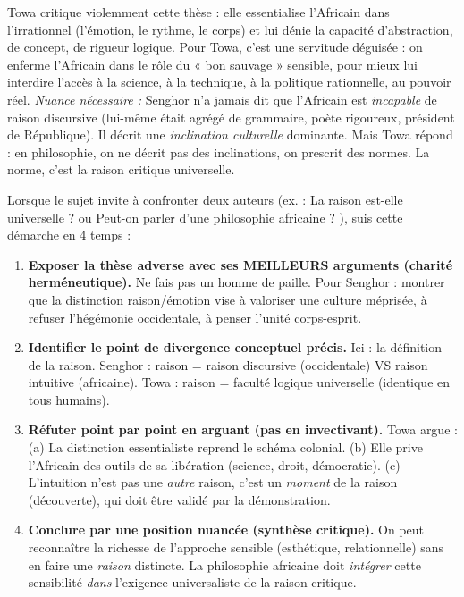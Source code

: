 \documentclass[11pt]{article}
\newcommand{\cle}[1]{{\popxbold\color{popdark}#1}}
\begin{document}
\begin{attention}
Towa critique violemment cette thèse : elle essentialise l'Africain dans l'irrationnel (l'émotion, le rythme, le corps) et lui dénie la capacité d'abstraction, de concept, de rigueur logique. Pour Towa, c'est une \guillemotleft servitude déguisée \guillemotright : on enferme l'Africain dans le rôle du « bon sauvage » sensible, pour mieux lui interdire l'accès à la science, à la technique, à la politique rationnelle, au pouvoir réel.
\emph{Nuance nécessaire :} Senghor n'a jamais dit que l'Africain est \emph{incapable} de raison discursive (lui-même était agrégé de grammaire, poète rigoureux, président de République). Il décrit une \emph{inclination culturelle} dominante. Mais Towa répond : en philosophie, on ne décrit pas des inclinations, on prescrit des normes. La norme, c'est la raison critique universelle.
\end{attention}

\begin{methode}
Lorsque le sujet invite à confronter deux auteurs (ex. : \guillemotleft La raison est-elle universelle ? \guillemotright ou \guillemotleft Peut-on parler d'une philosophie africaine ? \guillemotright), suis cette démarche en 4 temps :
\begin{enumerate}
\item \textbf{Exposer la thèse adverse avec ses MEILLEURS arguments (charité herméneutique).} Ne fais pas un homme de paille. Pour Senghor : montrer que la distinction raison/émotion vise à valoriser une culture méprisée, à refuser l'hégémonie occidentale, à penser l'unité corps-esprit.
\item \textbf{Identifier le point de divergence conceptuel précis.} Ici : la définition de la \cle{raison}. Senghor : raison = raison discursive (occidentale) VS raison intuitive (africaine). Towa : raison = faculté logique universelle (identique en tous humains).
\item \textbf{Réfuter point par point en arguant (pas en invectivant).} Towa argue : (a) La distinction essentialiste reprend le schéma colonial. (b) Elle prive l'Africain des outils de sa libération (science, droit, démocratie). (c) L'intuition n'est pas une \emph{autre} raison, c'est un \emph{moment} de la raison (découverte), qui doit être validé par la démonstration.
\item \textbf{Conclure par une position nuancée (synthèse critique).} On peut reconnaître la richesse de l'approche sensible (esthétique, relationnelle) sans en faire une \emph{raison} distincte. La philosophie africaine doit \emph{intégrer} cette sensibilité \emph{dans} l'exigence universaliste de la raison critique.
\end{enumerate}
\end{methode}
\end{document}
